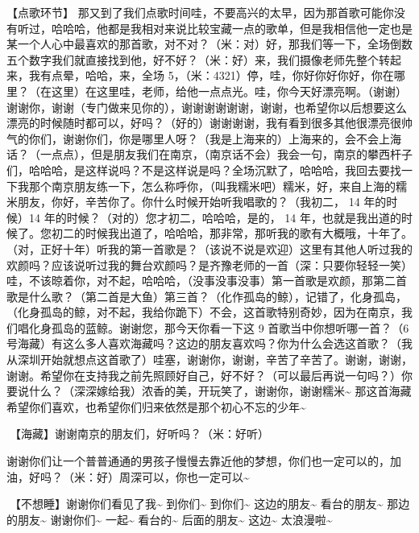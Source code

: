 \documentclass[
]{book}
\begin{document}
【点歌环节】
那又到了我们点歌时间哇，不要高兴的太早，因为那首歌可能你没有听过，哈哈哈，他都是我相对来说比较宝藏一点的歌单，但是我相信他一定也是某一个人心中最喜欢的那首歌，对不对？（米：对）好，那我们等一下，全场倒数五个数字我们就直接找到他，好不好？（米：好）来，我们摄像老师先整个转起来，我有点晕，哈哈，来，全场 5，（米：4321）停，哇，你好你好你好，你在哪里？（在这里）在这里哇，老师，给他一点点光。哇，你今天好漂亮啊。（谢谢）谢谢你，谢谢（专门做来见你的），谢谢谢谢谢谢，谢谢，也希望你以后想要这么漂亮的时候随时都可以，好吗？（好的）谢谢谢谢，我有看到很多其他很漂亮很帅气的你们，谢谢你们，你是哪里人呀？（我是上海来的）上海来的，会不会上海话？（一点点），但是朋友我们在南京，（南京话不会）我会一句，南京的攀西杆子们，哈哈哈，是这样说吗？不是这样说是吗？全场沉默了，哈哈哈，我回去要找一下我那个南京朋友练一下，怎么称呼你，（叫我糯米吧）糯米，好，来自上海的糯米朋友，你好，辛苦你了。你什么时候开始听我唱歌的？（我初二， 14 年的时候）14 年的时候？（对的）您才初二，哈哈哈，是的， 14 年，也就是我出道的时候了。您初二的时候我出道了，哈哈哈，那非常，那听我的歌有大概哦，十年了。（对，正好十年）听我的第一首歌是？（该说不说是欢迎）这里有其他人听过我的欢颜吗？应该说听过我的舞台欢颜吗？是齐豫老师的一首（深：只要你轻轻一笑）哇，不该晾着你，对不起，哈哈哈，（没事没事没事）第一首歌是欢颜，那第二首歌是什么歌？（第二首是大鱼）第三首？（化作孤岛的鲸），记错了，化身孤岛，（化身孤岛的鲸，对不起，我给你跪下）不会，这首歌特别奇妙，因为在南京，我们唱化身孤岛的蓝鲸。谢谢您，那今天你看一下这 9 首歌当中你想听哪一首？（6号海藏）有这么多人喜欢海藏吗？这边的朋友喜欢吗？你为什么会选这首歌？（我从深圳开始就想点这首歌了）哇塞，谢谢你，谢谢，辛苦了辛苦了。谢谢，谢谢，谢谢。希望你在支持我之前先照顾好自己，好不好？（可以最后再说一句吗？）你要说什么？（深深嫁给我）浓香的美，开玩笑了，谢谢你，谢谢糯米\textasciitilde{} 那这首海藏希望你们喜欢，也希望你们归来依然是那个初心不忘的少年\textasciitilde{}

🎵【海藏】谢谢南京的朋友们，好听吗？（米：好听）

谢谢你们让一个普普通通的男孩子慢慢去靠近他的梦想，你们也一定可以的，加油，好吗？（米：好）周深可以，你也一定可以\textasciitilde{}

🎵【不想睡】谢谢你们看见了我\textasciitilde{} 到你们\textasciitilde{} 到你们\textasciitilde{} 这边的朋友\textasciitilde{} 看台的朋友\textasciitilde{} 那边的朋友\textasciitilde{} 谢谢你们\textasciitilde{} 一起\textasciitilde{} 看台的\textasciitilde{} 后面的朋友\textasciitilde{} 这边\textasciitilde{} 太浪漫啦\textasciitilde{}
\end{document}
